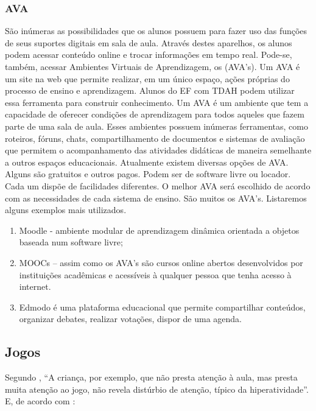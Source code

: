 \documentclass{textolivre}
\begin{document}
\subsubsection{AVA}\label{sec-ava}
São inúmeras as possibilidades que os alunos possuem para fazer uso das funções de seus suportes digitais em sala de aula. Através destes aparelhos, os alunos podem acessar conteúdo online e trocar informações em tempo real. Pode-se, também, acessar Ambientes Virtuais de Aprendizagem, os (AVA’s). Um AVA é um site na web que permite realizar, em um único espaço, ações próprias do processo de ensino e aprendizagem. Alunos do EF com TDAH podem utilizar essa ferramenta para construir conhecimento. Um AVA é um ambiente que tem a capacidade de oferecer condições de aprendizagem para todos aqueles que fazem parte de uma sala de aula. Esses ambientes possuem inúmeras ferramentas, como roteiros, fóruns, chats, compartilhamento de documentos e sistemas de avaliação que permitem o acompanhamento das atividades didáticas de maneira semelhante a outros espaços educacionais. Atualmente existem diversas opções de AVA. Alguns são gratuitos e outros pagos. Podem ser de software livre ou locador. Cada um dispõe de facilidades diferentes. O melhor AVA será escolhido de acordo com as necessidades de cada sistema de ensino. São muitos os AVA’s. Listaremos alguns exemplos mais utilizados. 

\begin{enumerate}[label={\alph*}]
    \item Moodle - ambiente modular de aprendizagem dinâmica orientada a objetos baseada num software livre;
    \item MOOCs – assim como os AVA’s são cursos online abertos desenvolvidos por instituições acadêmicas e acessíveis à qualquer pessoa que tenha acesso à internet. 
    \item Edmodo é uma plataforma educacional que permite compartilhar conteúdos, organizar debates, realizar votações, dispor de uma agenda. 
\end{enumerate}

\subsection{Jogos}\label{sec-jogos}
Segundo \textcite{antunes_glossario_2001}, “A criança, por exemplo, que não presta atenção à aula, mas presta muita atenção ao jogo, não revela distúrbio de atenção, típico da hiperatividade”. E, de acordo com \textcite[p. 64]{lopes_inclusao_2011}: 
\end{document}
